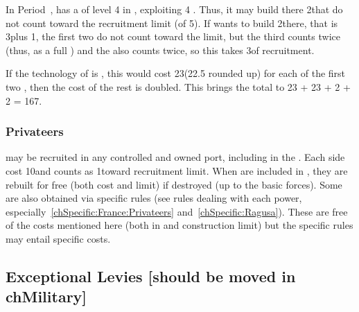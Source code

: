 \begin{exemple}
  In Period~, \FRA has a \COL of level 4 in
  , exploiting 4 . Thus, it may build
  there 2\NDE that do not count toward the recruitment limit (of 5\ND). If
  \FRA wants to build 2\ND there, that is 3\NDE plus 1\ND, the first two \NDE
  do not count toward the limit, but the third counts twice (thus, as a full
  \ND) and the \ND also counts twice, so this takes 3\ND of recruitment.

  If the technology of \FRA is \TBAT, this would cost 23\ducats (22.5 rounded
  up) for each of the first two \NDE, then the cost of the rest is
  doubled. This brings the total to 23 + 23 + 2  + 2
   = 167\ducats.
\end{exemple}

\subsubsection{Privateers}\label{chExpenses:Recruiting Privateers}
\aparag \corsaire may be recruited in any controlled and owned port, including
in the \ROTW.
\bparag Each side cost 10\ducats and counts as 1\ND toward recruitment limit.
\bparag When \corsaire are included in , they are rebuilt
for free (both cost and limit) if destroyed (up to the basic forces).
\bparag Some \corsaire are also obtained via specific rules (see rules dealing
with each power, especially~\ref{chSpecific:France:Privateers}
and~\ref{chSpecific:Ragusa}). These are free of the costs mentioned here (both
in \ducats and construction limit) but the specific rules may entail specific
costs.



\subsection{Exceptional Levies [should be moved in chMilitary]}
\label{chExpenses:Exceptional Levies}
\label{chMilitary:Exceptional Levies}


